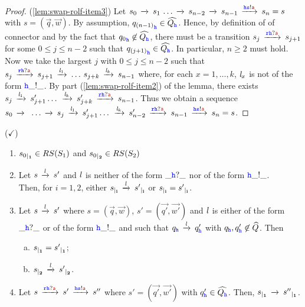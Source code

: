 \begin{proof}
(\ref{lem:swap-rolf-item3})
Let $s_0\lts{}  s_1\,\ldots \lts{} s_{n-2}  \lts{} s_{n-1}\lts{\HH\tts!\msg[a]}s_n=s$ with $s = (\vec{q},\vec{w})$.
By assumption, ${q_{(n-1)}}_{{\mathtt{\color{blue}{ {h}}}}}\in\widehat{Q_{{\mathtt{\color{blue}{ {h}}}}}}$.
Hence, by definition of of connector
 and by the fact that ${q_0}_{{\mathtt{\color{blue}{ {h}}}}}\not\in\widehat{Q_{{\mathtt{\color{blue}{ {h}}}}}}$,
 there must be a transition $s_j \lts{\ttr\HH?\msg[a]}s_{j+1}$ for
 some $0\leq j \leq n-2$ such that ${q_{(j+1)}}_{\mathtt{\color{blue}{ {h}}}}\in\widehat{Q_{\mathtt{\color{blue}{ {h}}}}}$. 
In particular, $n \geq 2$ must hold.
Now we take the largest $j$ with $0\leq j \leq n-2$ such that
 $s_j  \lts{\ttr\HH?\msg[a]} s_{j+1}\lts{\elle_1}\ldots\, s_{j+k}\lts{\elle_{k}}s_{n-1}$
 where, for each $x = 1,\ldots,k$,  $\mathit{l}_x$ is not of the form ${\mathtt{\color{blue}{ {h}}}}\_!\_$.
By part (\ref{lem:swap-rolf-item2}) of the lemma, there exists
 $s_j  \lts{\elle_1}s'_{j+1} \ldots\,  \lts{\elle_k} s'_{j+k} \lts{\ttr\HH?\msg[a]} s_{n-1}$. Thus we obtain a sequence
$s_0\lts{}\,\,\ldots \lts{}s_j  \lts{\elle_1}s'_{j+1} \ldots\,  \lts{\elle_k} s'_{n-2}\lts{\ttr\HH?\msg[a]}s_{n-1}\lts{\HH\tts!\msg[a]}s_n=s$.
\end{proof}



\begin{lemma} ($\checkmark$) \hfill
\label{lem:indrestrict}  
\begin{enumerate}[1)]
\item
\label{lem:indrestrict-a}
${s_0}_{\mid_{\mathbf{1}}}\in RS(S_1)$ and  ${s_0}_{\mid_{\mathbf{2}}}\in RS(S_2)$
\item
\label{lem:indrestrict-b}
Let $s\,\xrightarrow{\mathit{l}}_{{}}\,s'$ 
and $\mathit{l}$ is neither of the form $\_{\mathtt{\color{blue}{ {h}}}}?\_$ nor of the form ${\mathtt{\color{blue}{ {h}}}}\_!\_$.\\
Then, for $i=1,2$,  either ${s}_{\mid_{\mathbf{i}}}\,\xrightarrow{\mathit{l}}_{{}}\,{s'}_{\mid_{\mathbf{i}}}$ or  ${s}_{\mid_{\mathbf{i}}}={s'}_{\mid_{\mathbf{i}}}$.
\item
\label{lem:indrestrict-c}
Let $s\,\xrightarrow{\mathit{l}}_{{}}\,s'$ where $s= (\vec{q},\vec{w})$, $s'= (\vec{q'},\vec{w'})$
and  $\mathit{l}$ is either of the form $\_{\mathtt{\color{blue}{ {h}}}}?\_$ or of the form ${\mathtt{\color{blue}{ {h}}}}\_!\_$ and such that
$q_{\mathtt{\color{blue}{ {h}}}}\,\xrightarrow{\mathit{l}}_{{}}\,q'_{\mathtt{\color{blue}{ {h}}}}$ with $q_{\mathtt{\color{blue}{ {h}}}},q'_{\mathtt{\color{blue}{ {h}}}}\not\in\widehat{Q}$. Then
\begin{enumerate}[a)]
\item
\label{lem:indrestrict-c1}
${s}_{\mid_{\mathbf{1}}} = {s'}_{\mid_{\mathbf{1}}}$;
\item
\label{lem:indrestrict-c2}
${s}_{\mid_{\mathbf{2}}}\,\xrightarrow{\mathit{l}}_{{}}\,{s'}_{\mid_{\mathbf{2}}}$.
\end{enumerate}
\item
\label{lem:indrestrict-d}
Let $s\lts{\ttr\HH?\msg[a]} s'\lts{\HH\tts!\msg[a]} s''$ where $s'= (\vec{q'},\vec{w'})$ with $q'_{\mathtt{\color{blue}{ {h}}}}\in \widehat{Q_{\mathtt{\color{blue}{ {h}}}}}$.
Then, ${s}_{\mid_{\mathbf{1}}}\,\xrightarrow{}_{{}}\,{s''}_{\mid_{\mathbf{1}}}$.
\end{enumerate}
\end{lemma}

